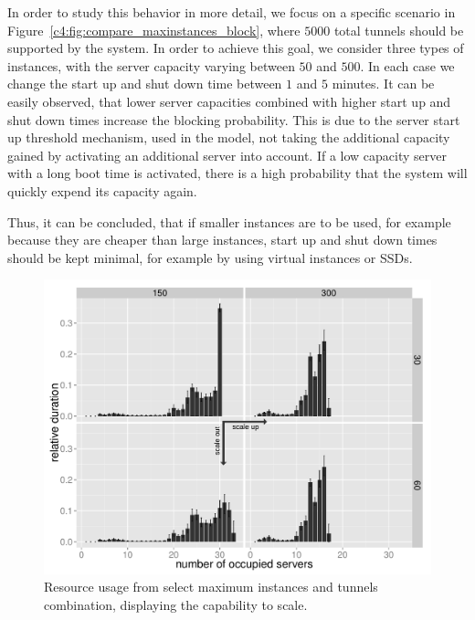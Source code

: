 In order to study this behavior in more detail, we focus on a specific scenario in Figure~\ref{c4:fig:compare_maxinstances_block}, where $5000$ total tunnels should be supported by the system. In order to achieve this goal, we consider three types of instances, with the server capacity varying between $50$ and $500$.  In each case we change the start up and shut down time between $1$ and $5$ minutes. It can be easily observed, that lower server capacities combined with higher start up and shut down times increase the blocking probability. This is due to the server start up threshold mechanism, used in the model, not taking the additional capacity gained by activating an additional server into account. If a low capacity server with a long boot time is activated, there is a high probability that the system will quickly expend its capacity again.

Thus, it can be concluded, that if smaller instances are to be used, for example because they are cheaper than large instances, start up and shut down times should be kept minimal, for example by using virtual instances or \glspl{SSD}.





\begin{figure}[htbp]
  \centering
  \includegraphics[width=1.0\textwidth]{images/resourceusedistribution-detail-barplot-annotated.pdf}
  \caption{Resource usage from select maximum instances and tunnels combination, displaying the capability to scale.}
 \label{c4:fig:res-usage-barplot}
\end{figure}


